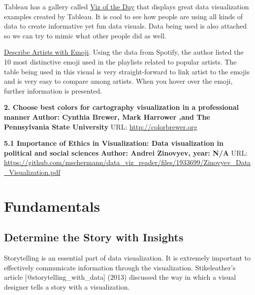 \documentclass[]{book}
\theoremstyle{definition}
\theoremstyle{definition}
\theoremstyle{definition}
\theoremstyle{remark}
\begin{document}
Tableau has a gallery called
\href{https://public.tableau.com/en-us/s/gallery}{Viz of the Day} that
displays great data visualization examples created by Tableau. It is
cool to see how people are using all kinds of data to create informative
yet fun data visuals. Data being used is also attached so we can try to
mimic what other people did as well.

\href{https://public.tableau.com/en-us/s/gallery/what-emoji-say-about-music?gallery=featured}{Describe
Artists with Emoji}. Using the data from Spotify, the author listed the
10 most distinctive emoji used in the playlists related to popular
artists. The table being used in this visual is very straight-forward to
link artist to the emojis and is very easy to compare among artists.
When you hover over the emoji, further information is presented.

\textbf{2. Choose best colors for cartography visualization in a
professional manner} \textbf{Author: Cynthia Brewer, Mark Harrower ,and
The Pennsylvania State University} URL: \url{http://colorbrewer.org}

\textbf{5.1 Importance of Ethics in Visualization: Data visualization in
political and social sciences} \textbf{Author: Andrei Zinovyev, year:
N/A} URL:
\url{https://github.com/mschermann/data_viz_reader/files/1933699/Zinovyev_Data_Visualization.pdf}

\chapter{Fundamentals}\label{fundamentals}

\section{Determine the Story with
Insights}\label{determine-the-story-with-insights}

Storytelling is an essential part of data visualization. It is extremely
important to effectively communicate information through the
visualization. Stikeleather's article {[}@storytelling\_with\_data{]}
(2013) discussed the way in which a visual designer tells a story with a
visualization.
\end{document}
